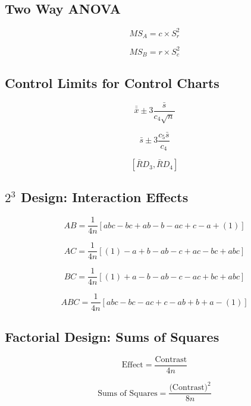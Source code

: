 \documentclass[a4paper,12pt]{article}
\begin{document}
\subsection*{Two Way ANOVA}
\begin{multicols}{2}
	
\[MS_A = c \times S^2_r\]

\[MS_B = r \times S^2_c\]
\end{multicols}


\subsection*{Control Limits for Control Charts}

\begin{multicols}{2}
	
\[ \bar{\bar{x}} \pm 3\frac{\bar{s}}{c_4\sqrt{n}}\]

\[ \bar{s} \pm 3\frac{c_5\bar{s}}{c_4}\]

\[\left[ \bar{R}D_3, \bar{R}D_4\right]\]
\end{multicols}
\subsection*{$2^3$ Design: Interaction Effects}

\[ AB = \frac{1}{4n} \left[ abc - bc + ab - b - ac + c - a + (1) \right] \]

\[ AC = \frac{1}{4n} \left[ (1) - a + b - ab -c + ac - bc + abc \right] \]

\[ BC = \frac{1}{4n} \left[ (1) + a - b - ab - c - ac + bc + abc \right] \]

\[ABC = \frac{1}{4n} \left[ abc - bc - ac + c - ab + b +  a - (1) \right] \]

\bigskip


\subsection*{Factorial Design: Sums of Squares}

\[\mbox{Effect} =  \frac{\mbox{Contrast}}{4n}\]

\[\mbox{Sums of Squares} =  \frac{\mbox{(Contrast)}^2}{8n}\]
\end{document}
